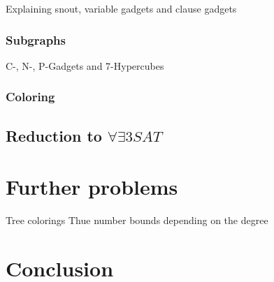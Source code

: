 \documentclass[12pt,a4paper]{article}
\begin{document}
Explaining snout, variable gadgets and clause gadgets

\subsubsection{Subgraphs}

C-, N-, P-Gadgets and 7-Hypercubes

\subsubsection{Coloring}
\subsection{Reduction to $ \forall \exists 3SAT $}
\section{Further problems}

Tree colorings
\newline
Thue number bounds depending on the degree

\section{Conclusion}
\printbibliography
\end{document}
